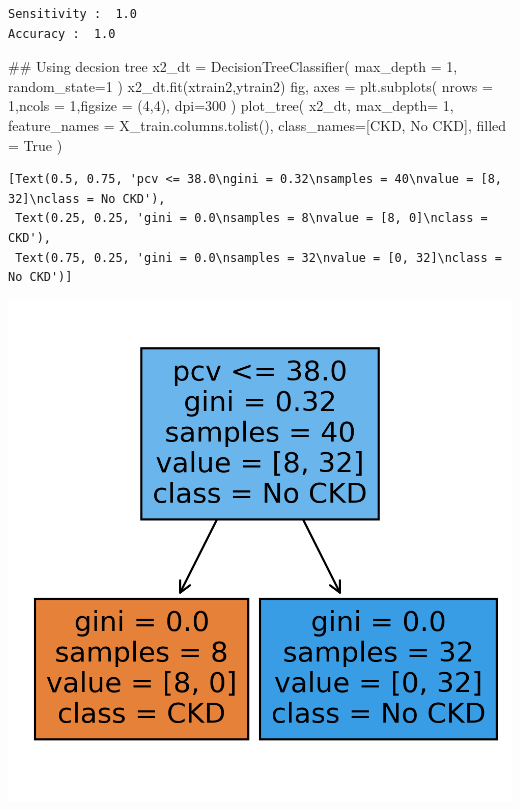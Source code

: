 \documentclass[
  11pt,
  letterpaper,
  DIV=11,
  numbers=noendperiod]{scrartcl}
\newenvironment{Shaded}{\begin{snugshade}}{\end{snugshade}}
\newcommand{\CommentTok}[1]{\textcolor[rgb]{0.37,0.37,0.37}{#1}}
\newcommand{\DecValTok}[1]{\textcolor[rgb]{0.68,0.00,0.00}{#1}}
\newcommand{\NormalTok}[1]{\textcolor[rgb]{0.00,0.23,0.31}{#1}}
\newcommand{\OperatorTok}[1]{\textcolor[rgb]{0.37,0.37,0.37}{#1}}
\newcommand{\StringTok}[1]{\textcolor[rgb]{0.13,0.47,0.30}{#1}}
\newcommand{\VariableTok}[1]{\textcolor[rgb]{0.07,0.07,0.07}{#1}}
\begin{document}
\begin{verbatim}
Sensitivity :  1.0
Accuracy :  1.0
\end{verbatim}

\begin{Shaded}
\begin{Highlighting}[]
\CommentTok{\#\# Using decsion tree}
\NormalTok{x2\_dt }\OperatorTok{=}\NormalTok{ DecisionTreeClassifier(}
\NormalTok{    max\_depth }\OperatorTok{=} \DecValTok{1}\NormalTok{,}
\NormalTok{    random\_state}\OperatorTok{=}\DecValTok{1}
\NormalTok{) }
\NormalTok{x2\_dt.fit(xtrain2,ytrain2)}
\NormalTok{fig, axes }\OperatorTok{=}\NormalTok{ plt.subplots(}
\NormalTok{    nrows }\OperatorTok{=} \DecValTok{1}\NormalTok{,ncols }\OperatorTok{=} \DecValTok{1}\NormalTok{,figsize }\OperatorTok{=}\NormalTok{ (}\DecValTok{4}\NormalTok{,}\DecValTok{4}\NormalTok{), dpi}\OperatorTok{=}\DecValTok{300}
\NormalTok{    )}
\NormalTok{plot\_tree(}
\NormalTok{    x2\_dt, }
\NormalTok{    max\_depth}\OperatorTok{=} \DecValTok{1}\NormalTok{, }
\NormalTok{    feature\_names }\OperatorTok{=}\NormalTok{ X\_train.columns.tolist(), }
\NormalTok{    class\_names}\OperatorTok{=}\NormalTok{[}\StringTok{\textquotesingle{}CKD\textquotesingle{}}\NormalTok{, }\StringTok{\textquotesingle{}No CKD\textquotesingle{}}\NormalTok{], }
\NormalTok{    filled }\OperatorTok{=} \VariableTok{True}
\NormalTok{    )}
\end{Highlighting}
\end{Shaded}

\begin{verbatim}
[Text(0.5, 0.75, 'pcv <= 38.0\ngini = 0.32\nsamples = 40\nvalue = [8, 32]\nclass = No CKD'),
 Text(0.25, 0.25, 'gini = 0.0\nsamples = 8\nvalue = [8, 0]\nclass = CKD'),
 Text(0.75, 0.25, 'gini = 0.0\nsamples = 32\nvalue = [0, 32]\nclass = No CKD')]
\end{verbatim}

\includegraphics{Seebach_Lily_HW6_files/figure-pdf/cell-28-output-2.png}
\end{document}
